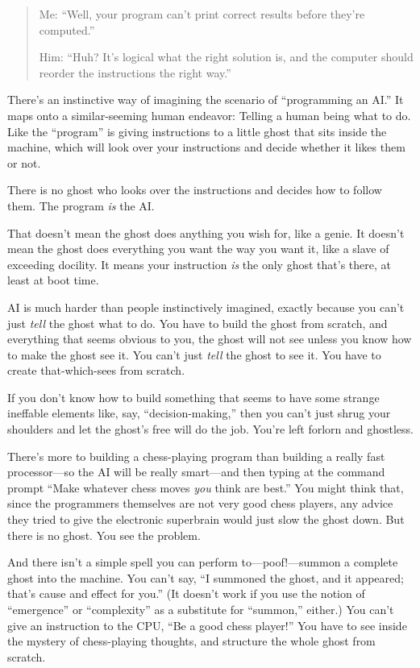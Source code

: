 {\begin{quote}
{
 Me: ``Well, your program can't
print correct results before they're
computed.''}

{
 Him: ``Huh? It's logical what the
right solution is, and the computer should reorder the instructions the
right way.''}
\end{quote}

{
 There's an instinctive way of imagining the
scenario of ``programming an AI.''
It maps onto a similar-seeming human endeavor: Telling a human being
what to do. Like the ``program'' is
giving instructions to a little ghost that sits inside the machine,
which will look over your instructions and decide whether it likes them
or not.}

{
 There is no ghost who looks over the instructions and decides how
to follow them. The program \textit{is} the AI.}

{
 That doesn't mean the ghost does anything you wish
for, like a genie. It doesn't mean the ghost does
everything you want the way you want it, like a slave of exceeding
docility. It means your instruction \textit{is} the only ghost
that's there, at least at boot time.}

{
 AI is much harder than people instinctively imagined, exactly
because you can't just \textit{tell} the ghost what to
do. You have to build the ghost from scratch, and everything that seems
obvious to you, the ghost will not see unless you know how to make the
ghost see it. You can't just \textit{tell} the ghost to
see it. You have to create that-which-sees from scratch.}

{
 If you don't know how to build something that
seems to have some strange ineffable elements like, say,
``decision-making,'' then you
can't just shrug your shoulders and let the
ghost's free will do the job. You're
left forlorn and ghostless.}

{
 There's more to building a chess-playing program
than building a really fast processor---so the AI will be really
smart---and then typing at the command prompt ``Make
whatever chess moves \textit{you} think are best.''
You might think that, since the programmers themselves are not very
good chess players, any advice they tried to give the electronic
superbrain would just slow the ghost down. But there is no ghost. You
see the problem.}

{
 And there isn't a simple spell you can perform
to---poof!---summon a complete ghost into the machine. You
can't say, ``I summoned the ghost, and
it appeared; that's cause and effect for
you.'' (It doesn't work if you use
the notion of ``emergence'' or
``complexity'' as a substitute for
``summon,'' either.) You
can't give an instruction to the CPU,
``Be a good chess player!'' You have
to see inside the mystery of chess-playing thoughts, and structure the
whole ghost from scratch.}

}
